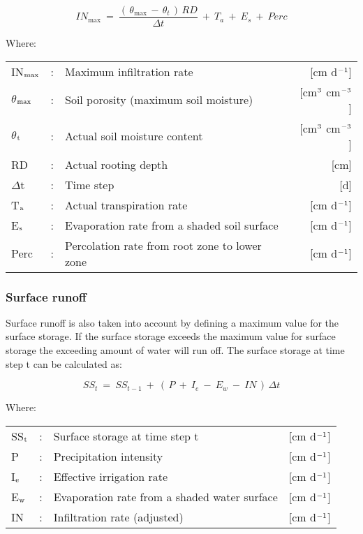 \begin{equation}
\label{eq:6.28}
IN_{\max } ~=~{\frac{(\, \theta  _{\max } \, -\, \theta  _{t} \, )\, RD}{\Delta t}} ~+~ T _{a} ~+~ E _{s} ~+~ Perc
\end{equation}

Where:\\[5pt]
\begin{tabularx}{\textwidth}{llXr}
IN$_{{\rm max}}$ &:& Maximum infiltration rate  & [cm d$^{{\rm -1}}$]\\
$\theta$$_{{\rm max}}$ &:& Soil porosity (maximum soil moisture)  
    & [cm$^{{\rm 3}}$ cm$^{{\rm -3}}$]\\
$\theta$$_{{\rm t}}$ &:& Actual soil moisture content  
    & [cm$^{{\rm 3}}$ cm$^{{\rm -3}}$]\\
RD &:& Actual rooting depth  & [cm]\\
$\Delta$t &:& Time step  & [d]\\
T$_{{\rm a}}$ &:& Actual transpiration rate   & [cm d$^{{\rm -1}}$]\\
E$_{{\rm s}}$ &:& Evaporation rate from a shaded soil surface  & [cm d$^{{\rm -1}}$]\\
Perc &:& Percolation rate from root zone to lower zone  & [cm d$^{{\rm -1}}$]\\
\end{tabularx}

\subsubsection{Surface runoff}

Surface runoff is also taken into account by defining a maximum value for the surface
storage. If the surface storage exceeds the maximum value for surface storage the
exceeding amount of water will run off. The surface storage at time step t can be
calculated as:

\begin{equation}
\label{eq:6.29}
SS_{t} ~=~ SS _{t-1} ~+~ (\, P ~+~ I _{e} ~-~ E _{w} ~-~ IN\, )\, \Delta t
\end{equation}

Where:\\[5pt]
\begin{tabularx}{\textwidth}{llXr}
SS$_{{\rm t}}$ &:& Surface storage at time step t  & [cm d$^{{\rm -1}}$]\\
P &:& Precipitation intensity  & [cm d$^{{\rm -1}}$]\\
I$_{{\rm e}}$ &:& Effective irrigation rate  & [cm d$^{{\rm -1}}$]\\
E$_{{\rm w}}$ &:& Evaporation rate from a shaded water surface  & [cm d$^{{\rm -1}}$]\\
IN &:& Infiltration rate (adjusted)  & [cm d$^{{\rm -1}}$]\\
\end{tabularx}

